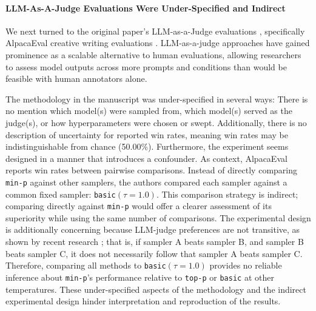 \paragraph{LLM-As-A-Judge Evaluations Were Under-Specified and Indirect}

We next turned to the original paper's LLM-as-a-Judge evaluations \citep{zheng2023judging}, specifically AlpacaEval creative writing evaluations \citep{dubois2023alpacafarm}.
LLM-as-a-judge approaches have gained prominence as a scalable alternative to human evaluations, allowing researchers to assess model outputs across more prompts and conditions than would be feasible with human annotators alone.



The methodology in the manuscript was under-specified in several ways: There is no mention which model(s) were sampled from, which model(s) served as the judge(s), or how hyperparameters were chosen or swept.
Additionally, there is no description of uncertainty for reported win rates, meaning win rates may be indistinguishable from chance (50.00\%).
Furthermore, the experiment seems designed in a manner that introduces a confounder. As context, AlpacaEval reports win rates between pairwise comparisons.
Instead of directly comparing \texttt{min-p} against other samplers, the authors compared each sampler against a common fixed sampler: \texttt{basic}$(\tau=1.0)$.
This comparison strategy is indirect; comparing directly against \texttt{min-p} would offer a clearer assessment of its superiority while using the same number of comparisons.
The experimental design is additionally concerning because LLM-judge preferences are not transitive, as shown by recent research \citep{xu2025investigatingnontransitivityllmasajudge}; that is, if sampler A beats sampler B, and sampler B beats sampler C, it does not necessarily follow that sampler A beats sampler C.
Therefore, comparing all methods to \texttt{basic}$(\tau=1.0)$ provides no reliable inference about \texttt{min-p}’s performance relative to \texttt{top-p} or \texttt{basic} at other temperatures. These under-specified aspects of the methodology and the indirect experimental design hinder interpretation and reproduction of the results.
